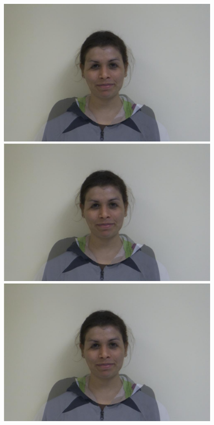 \documentclass[11pt]{article}
\begin{document}
\begin{figure}[H]
\begin{center}
\includegraphics[scale=0.06]{figs/frames/morph_steinkirch_tangatur_25.jpg} 
\includegraphics[scale=0.06]{figs/frames/morph_steinkirch_tangatur_26.jpg} 
\includegraphics[scale=0.06]{figs/frames/morph_steinkirch_tangatur_27.jpg} 

\end{center}
\end{figure}
\end{document}

